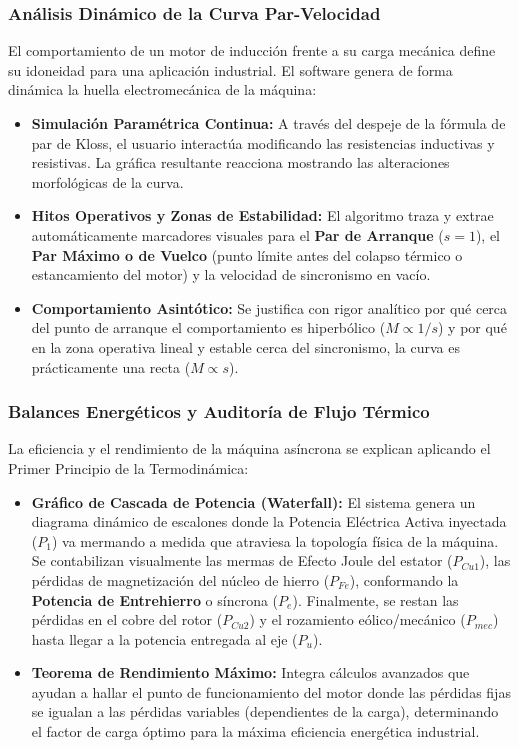 \documentclass[11pt,a4paper]{article}
\begin{document}
\subsubsection{Análisis Dinámico de la Curva Par-Velocidad}
El comportamiento de un motor de inducción frente a su carga mecánica define su idoneidad para una aplicación industrial. El software genera de forma dinámica la huella electromecánica de la máquina:
\begin{itemize}
    \item \textbf{Simulación Paramétrica Continua:} A través del despeje de la fórmula de par de Kloss, el usuario interactúa modificando las resistencias inductivas y resistivas. La gráfica resultante reacciona mostrando las alteraciones morfológicas de la curva.
    \item \textbf{Hitos Operativos y Zonas de Estabilidad:} El algoritmo traza y extrae automáticamente marcadores visuales para el \textbf{Par de Arranque} ($s=1$), el \textbf{Par Máximo o de Vuelco} (punto límite antes del colapso térmico o estancamiento del motor) y la velocidad de sincronismo en vacío.
    \item \textbf{Comportamiento Asintótico:} Se justifica con rigor analítico por qué cerca del punto de arranque el comportamiento es hiperbólico ($M \propto 1/s$) y por qué en la zona operativa lineal y estable cerca del sincronismo, la curva es prácticamente una recta ($M \propto s$).
\end{itemize}

\subsubsection{Balances Energéticos y Auditoría de Flujo Térmico}
La eficiencia y el rendimiento de la máquina asíncrona se explican aplicando el Primer Principio de la Termodinámica:
\begin{itemize}
    \item \textbf{Gráfico de Cascada de Potencia (Waterfall):} El sistema genera un diagrama dinámico de escalones donde la Potencia Eléctrica Activa inyectada ($P_1$) va mermando a medida que atraviesa la topología física de la máquina. Se contabilizan visualmente las mermas de Efecto Joule del estator ($P_{Cu1}$), las pérdidas de magnetización del núcleo de hierro ($P_{Fe}$), conformando la \textbf{Potencia de Entrehierro} o síncrona ($P_e$). Finalmente, se restan las pérdidas en el cobre del rotor ($P_{Cu2}$) y el rozamiento eólico/mecánico ($P_{mec}$) hasta llegar a la potencia entregada al eje ($P_u$).
    \item \textbf{Teorema de Rendimiento Máximo:} Integra cálculos avanzados que ayudan a hallar el punto de funcionamiento del motor donde las pérdidas fijas se igualan a las pérdidas variables (dependientes de la carga), determinando el factor de carga óptimo para la máxima eficiencia energética industrial.
\end{itemize}
\end{document}
